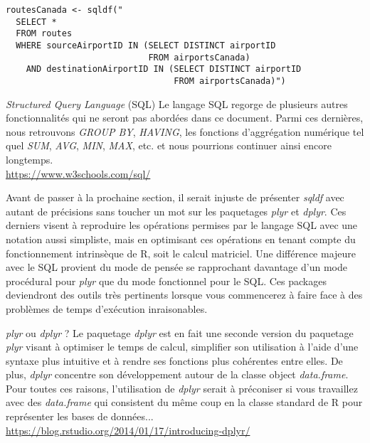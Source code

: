 \begin{lstlisting}[caption = Fonctionnalités avancées de SQL,label=src:interlinkedSQL]
routesCanada <- sqldf("
  SELECT *
  FROM routes
  WHERE sourceAirportID IN (SELECT DISTINCT airportID
                            FROM airportsCanada)
    AND destinationAirportID IN (SELECT DISTINCT airportID
                                 FROM airportsCanada)")                           
\end{lstlisting}

\begin{moreInfo}{\emph{Structured Query Language} (SQL)}
	Le langage SQL regorge de plusieurs autres fonctionnalités qui ne seront pas abordées dans ce document. Parmi ces dernières, nous retrouvons \emph{GROUP BY}, \emph{HAVING}, les fonctions d'aggrégation numérique tel quel \emph{SUM}, \emph{AVG}, \emph{MIN}, \emph{MAX}, etc. et nous pourrions continuer ainsi encore longtemps. \\
	\url{https://www.w3schools.com/sql/}
\end{moreInfo}

\noindent
Avant de passer à la prochaine section, il serait injuste de présenter \emph{sqldf} avec autant de précisions sans toucher un mot sur les paquetages \emph{plyr} et \emph{dplyr}. Ces derniers visent à reproduire les opérations permises par le langage SQL avec une notation aussi simpliste, mais en optimisant ces opérations en tenant compte du fonctionnement intrinsèque de R, soit le calcul matriciel. Une différence majeure avec le SQL provient du mode de pensée se rapprochant davantage d'un mode procédural pour \emph{plyr} que du mode fonctionnel pour le SQL. Ces packages deviendront des outils très pertinents lorsque vous commencerez à faire face à des problèmes de temps d'exécution inraisonables.

\begin{moreInfo}{\emph{plyr} ou \emph{dplyr} ?}
	Le paquetage \emph{dplyr} est en fait une seconde version du paquetage \emph{plyr} visant à optimiser le temps de calcul, simplifier son utilisation à l'aide d'une syntaxe plus intuitive et à rendre ses fonctions plus cohérentes entre elles. De plus, \emph{dplyr} concentre son développement autour de la classe object \emph{data.frame}. Pour toutes ces raisons, l'utilisation de \emph{dplyr} serait à préconiser si vous travaillez avec des \emph{data.frame} qui consistent du même coup en la classe standard de R pour représenter les bases de données...\\
	\url{https://blog.rstudio.org/2014/01/17/introducing-dplyr/}
\end{moreInfo}